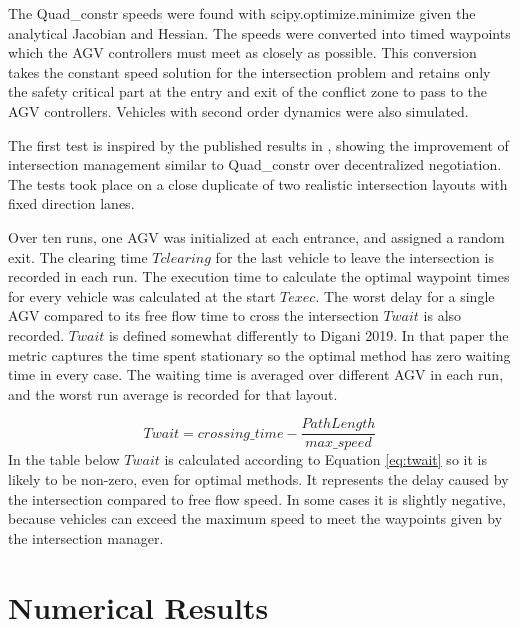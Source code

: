 \documentclass[11pt]{article} %
\begin{document}
The Quad\_constr speeds were found with scipy.optimize.minimize given the analytical Jacobian and Hessian.
The speeds were converted into timed waypoints which the AGV controllers must meet as closely as possible. This conversion takes the constant speed solution for the intersection problem and retains only the safety critical part at the entry and exit of the conflict zone to pass to the AGV controllers. Vehicles with second order dynamics were also simulated.

The first test is inspired by the published results in \cite{Digani2019}, showing the improvement of intersection management similar to Quad\_constr over decentralized negotiation. The tests took place on a close duplicate of two realistic intersection layouts with fixed direction lanes.

Over ten runs, one AGV was initialized at each entrance, and assigned a random exit.   The clearing time $Tclearing$ for the last vehicle to leave the intersection is recorded in each run. The execution time to calculate the optimal waypoint times for every vehicle was calculated at the start $Texec$. The worst delay for a single AGV compared to its free flow time to cross the intersection $Twait$ is also recorded.
$Twait$ is defined somewhat differently to Digani 2019. In that paper the metric captures the time spent stationary so the optimal method has zero waiting time in every case. The waiting time is averaged over different AGV in each run, and the worst run average is recorded for that layout.

\begin{equation}
\label{eq:twait}
Twait = crossing\_time - \frac{PathLength}{max\_speed} 
\end{equation}
In the table below $Twait$ is calculated according to Equation \ref{eq:twait} so it is likely to be non-zero, even for optimal methods. It represents the delay caused by the intersection compared to free flow speed. In some cases it is slightly negative, because vehicles can exceed the maximum speed to meet the waypoints given by the intersection manager.   
\section{Numerical Results}
\label{sec:num_res}


\end{document}
